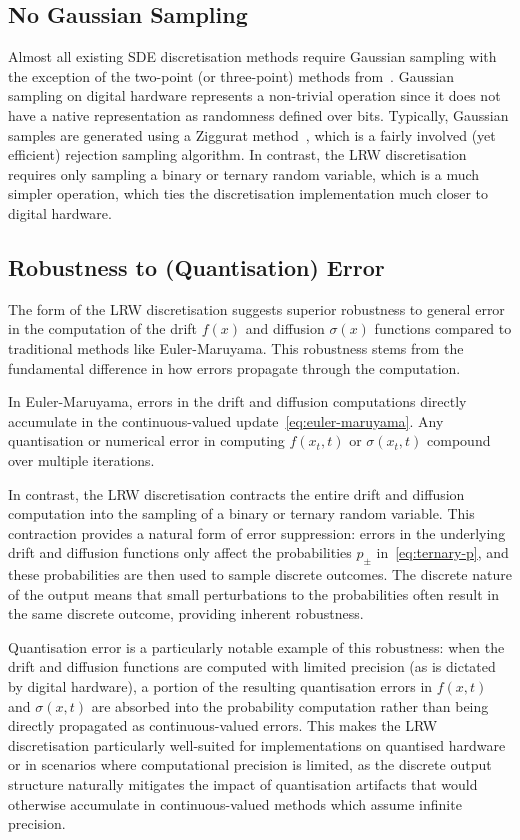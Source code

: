 \documentclass[pra,showpacs,amsmath,amssymb,amsfonts,lengthcheck,longbibliography,onecolumn]{revtex4-2}
\newcommand{\MA}[1]{{\color[RGB]{250, 0, 0}{MA: #1}}}
\begin{document}
\subsection{No Gaussian Sampling}

Almost all existing SDE discretisation methods require Gaussian sampling with
the exception of the two-point (or three-point) methods from~\cite{kloeden1992stochastic}.
Gaussian sampling on digital hardware represents a non-trivial operation since it does
not have a native representation as randomness defined over bits. Typically, Gaussian
samples are generated using a Ziggurat method~\cite{harris2020array}, which is a fairly
involved (yet efficient) rejection sampling algorithm. In contrast, the LRW discretisation
requires only sampling a binary or ternary random variable, which is a much simpler operation,
which ties the discretisation implementation much closer to digital hardware.


\subsection{Robustness to (Quantisation) Error}


The form of the LRW discretisation suggests superior robustness to general error 
in the computation of the drift $f(x)$ and diffusion $\sigma(x)$ functions
compared to traditional methods like Euler-Maruyama. This robustness stems from the fundamental
difference in how errors propagate through the computation.

In Euler-Maruyama, errors in the drift and diffusion computations directly accumulate in the 
continuous-valued update~\eqref{eq:euler-maruyama}. 
Any quantisation or numerical error in computing $f(x_t, t)$ or $\sigma(x_t, t)$ compound 
over multiple iterations.

In contrast, the LRW discretisation contracts the entire drift and diffusion 
computation into the sampling of a binary or ternary random variable. This contraction provides 
a natural form of error suppression: errors in the underlying drift and diffusion functions only 
affect the probabilities $p_\pm$ in~\eqref{eq:ternary-p}, and these probabilities are then used 
to sample discrete outcomes. The discrete nature of the output means that small perturbations 
to the probabilities often result in the same discrete outcome, providing inherent robustness.

Quantisation error is a particularly notable example of this robustness: when the drift and 
diffusion functions are computed with limited precision (as is dictated by digital hardware), 
a portion of the resulting quantisation errors in $f(x,t)$ and $\sigma(x,t)$ are absorbed into the probability 
computation rather than being directly propagated as continuous-valued errors. This makes the 
LRW discretisation particularly well-suited for implementations on quantised 
hardware or in scenarios where computational precision is limited, as the discrete output 
structure naturally mitigates the impact of quantisation artifacts that would otherwise 
accumulate in continuous-valued methods which assume infinite precision.
\end{document}

